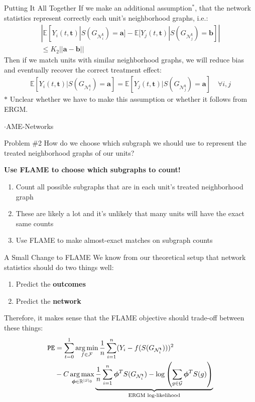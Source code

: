 \documentclass[newPxFont,numfooter,sectionpages]{beamer}
\DeclareMathOperator*{\argmin}{arg\,min}
\DeclareMathOperator*{\argmax}{arg\,max}
\newcommand{\E}{\mathbb{E}}
\newcommand{\bt}{\mathbf{t}}
\newcommand{\Gni}{G_{\mathcal{N}_i^\bt}}
\newcommand{\Gnj}{G_{\mathcal{N}_j^\bt}}
\newcommand{\btheta}{\boldsymbol{\phi}}
\begin{document}
\begin{frame}{Putting It All Together}
If we make an additional assumption$^*$, that the network statistics represent correctly each unit's neighborhood graphs, i.e.:
\begin{align*}
|\E[Y_i(t, \bt)|S(\Gni)=\mathbf{a}] - \E[Y_j(t, \bt)|S(\Gnj)=\mathbf{b}]| \\ \leq K_2||\mathbf{a} - \mathbf{b}||
\end{align*}
Then if we match units with similar neighborhood graphs, we will reduce bias and eventually recover the correct treatment effect:
\begin{align*}
\E[Y_i(t, \bt)|S(\Gni)=\mathbf{a}] = \E[Y_j(t, \bt)|S(\Gnj)=\mathbf{a}]\quad \forall i, j
\end{align*}
$*$ \small{Unclear whether we have to make this assumption or whether it follows from ERGM. }
\end{frame}
\begin{frame}{$\cdot$AME-Networks}
\begin{alertblock}{Problem \#2}
How do we choose which subgraph we should use to represent the treated neighborhood graphs of our units?
\end{alertblock}
\textbf{Use FLAME to choose which subgraphs to count!}
\begin{enumerate}
  \item Count all possible subgraphs that are in each unit's treated neighborhood graph
  \item These are likely a lot and it's unlikely that many units will have the exact same counts
  \item Use FLAME to make almost-exact matches on subgraph counts 
\end{enumerate}
\end{frame}
\begin{frame}{A Small Change to FLAME}
We know from our theoretical setup that network statistics should do two things well:
\begin{enumerate}
  \item Predict the \textbf{outcomes}
  \item Predict the \textbf{network}
\end{enumerate}
Therefore, it makes sense that the FLAME objective should trade-off between these things:
\begin{align*}
{\tt PE} &= \sum_{t = 0}^1\argmin_{f \in \mathcal{F}}\frac{1}{n}\sum_{i = 1}^n(Y_i - f(S(\Gni)))^2\\
         &- C\argmax_{\btheta \in \mathbb{R}^{|S|_0}}\underbrace{\frac{1}{n}\sum_{i=1}^n\btheta^TS(\Gni) - \log\left(\sum_{g \in \mathcal{G}} \btheta^TS(g)\right)}_{\text{ERGM log-likelihood}}
\end{align*}
\end{frame}
\end{document}
